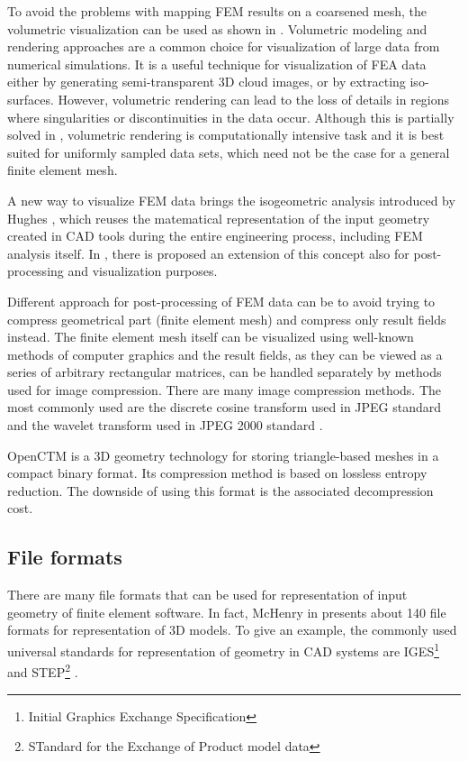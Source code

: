 To avoid the problems with mapping FEM results on a coarsened mesh, the volumetric visualization can be used as shown in \cite{Ueng2004}. Volumetric modeling and rendering approaches are a common choice for visualization of large data from numerical simulations. It is a useful technique for visualization of FEA data either by generating semi-transparent 3D cloud images, or by extracting iso-surfaces. However, volumetric rendering can lead to the loss of details in regions where singularities or discontinuities in the data occur. Although this is partially solved in \cite{Robaina2010}, volumetric rendering is computationally intensive task and it is best suited for uniformly sampled data sets, which need not be the case for a general finite element mesh.

A new way to visualize FEM data brings the isogeometric analysis introduced by Hughes \cite{Hughes2005}, which reuses the matematical representation of the input geometry created in CAD tools during the entire engineering process, including FEM analysis itself. In \cite{Stahl2017}, there is proposed an extension of this concept also for post-processing and visualization purposes.

Different approach for post-processing of FEM data can be to avoid trying to compress geometrical part (finite element mesh) and compress only result fields instead. The finite element mesh itself can be visualized using well-known methods of computer graphics and the result fields, as they can be viewed as a series of arbitrary rectangular matrices, can be handled separately by methods used for image compression. There are many image compression methods. The most commonly used are the discrete cosine transform \cite{Watson1994} used in JPEG standard and the wavelet transform used in JPEG 2000 standard \cite{Lui2001}.

OpenCTM \cite{OpenCTM2010} is a 3D geometry technology for storing triangle-based meshes in a compact binary format. Its compression method is based on lossless entropy reduction. The downside of using this format is the associated decompression cost.


\subsection{File formats}

There are many file formats that can be used for representation of input geometry of finite element software. In fact, McHenry in \cite{McHenry2008} presents about 140 file formats for representation of 3D models. To give an example, the commonly used universal standards for representation of geometry in CAD systems are IGES\footnote{Initial Graphics Exchange Specification} \cite{Groton2006} and STEP\footnote{STandard for the Exchange of Product model data} \cite{Pratt2001}.

